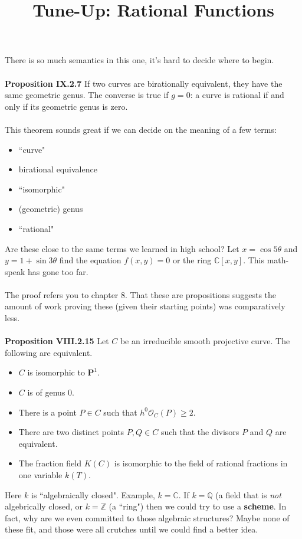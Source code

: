 \documentclass[12pt]{article}
\title{Tune-Up: Rational Functions}
\date{}
\begin{document}
\sffamily

\maketitle

\noindent There is so much semantics in this one, it's hard to decide where to begin. \\ \\
\textbf{Proposition IX.2.7} {\color{black!25!white}If two curves are birationally equivalent, they have the same geometric genus.  The converse is true if $g = 0$:} a curve is rational if and only if its geometric genus is zero. \\ \\
This theorem sounds great if we can decide on the meaning of a few terms:
\begin{itemize}
\item ``curve"
\item birational equivalence
\item ``isomorphic"
\item (geometric) genus
\item ``rational"
\end{itemize} 
Are these close to the same terms we learned in high school?  Let $x = \cos 5\theta$ and $y = 1 + \sin 3 \theta$ find the equation $f(x,y) = 0$ or the ring $\mathbb{C}[x,y]$.  This math-speak has gone too far. \\ \\
The proof refers you to chapter 8.  That these are propositions suggests the amount of work proving these (given their starting points) was comparatively less.  \\ \\
\textbf{Proposition VIII.2.15} Let $C$ be an irreducible smooth projective curve.  The following are equivalent.
\begin{itemize}
\item $C$ is isomorphic to $\mathbf{P}^1$.
\item $C$ is of genus $0$.
\item There is a point $P \in C$ such that $h^0 \mathcal{O}_C(P) \geq 2$.
\item There are two distinct points $P, Q \in C$ such that the divisors $P$ and $Q$ are equivalent.
\item The fraction field $K(C)$ is isomorphic to the field of rational fractions in one variable $k(T)$.  
\end{itemize}
Here $k$ is ``algebraically closed".  Example, $k = \mathbb{C}$. If $k = \mathbb{Q}$ (a field that is \textit{not} algebrically closed, or $k = \mathbb{Z}$ (a ``ring") then we could try to use a \textbf{scheme}. In fact, why are we even committed to those algebraic structures?  Maybe none of these fit, and those were all crutches until we could find a better idea. \\ \\
\end{document}
